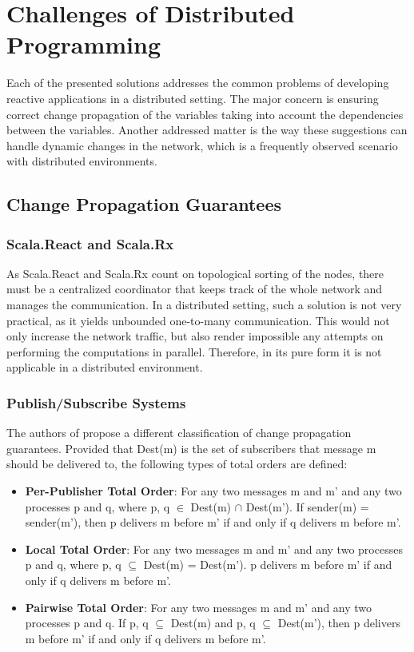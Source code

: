 \documentclass{sigplanconf}
\begin{document}
\section{Challenges of Distributed Programming}
Each of the presented solutions addresses the common problems of developing reactive applications in a distributed setting. The major concern is ensuring correct change propagation of the variables taking into account the dependencies between the variables. Another addressed matter is the way these suggestions can handle dynamic changes in the network, which is a frequently observed scenario with distributed environments.

\subsection{Change Propagation Guarantees}
\subsubsection{Scala.React and Scala.Rx}
As Scala.React and Scala.Rx count on topological sorting of the nodes, there must be a centralized coordinator that keeps track of the whole network and manages the communication. In a distributed setting, such a solution is not very practical, as it yields unbounded one-to-many communication. This would not only increase the network traffic, but also render impossible any attempts on performing the computations in parallel. Therefore, in its pure form it is not applicable in a distributed environment.

\subsubsection{Publish/Subscribe Systems}
The authors of \cite{totalorder} propose a different classification of change propagation guarantees. Provided that Dest(m) is the set of subscribers that message m should be delivered to, the following types of total orders are defined:

\begin{itemize} \itemsep1pt \parskip0pt 
  \item \textbf{Per-Publisher Total Order}: For any two messages m and m' and any two processes p and q, where {p, q} $\in$ Dest(m) $\cap$ Dest(m'). If sender(m) = sender(m'), then p delivers m before m' if and only if q delivers m before m'.

  \item \textbf{Local Total Order}: For any two messages m and m' and any two processes p and q, where {p, q} $\subseteq$ Dest(m) = Dest(m'). p delivers m before m' if and only if q delivers m before m'.

  \item \textbf{Pairwise Total Order}: For any two messages m and m' and any two processes p and q. If {p, q} $\subseteq$ Dest(m) and {p, q} $\subseteq$ Dest(m'), then p delivers m before m' if and only if q delivers m before m'.

\end{itemize}
\end{document}
